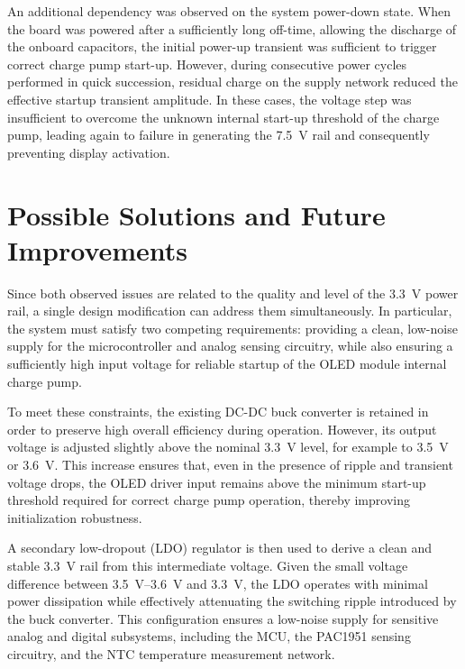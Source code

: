 An additional dependency was observed on the system power-down state. When the board was powered after a sufficiently long off-time, allowing the discharge of the onboard capacitors, the initial power-up transient was sufficient to trigger correct charge pump start-up. However, during consecutive power cycles performed in quick succession, residual charge on the supply network reduced the effective startup transient amplitude. In these cases, the voltage step was insufficient to overcome the unknown internal start-up threshold of the charge pump, leading again to failure in generating the \SI{7.5}{\volt} rail and consequently preventing display activation.

\section{Possible Solutions and Future Improvements}

Since both observed issues are related to the quality and level of the \SI{3.3}{\volt} power rail, a single design modification can address them simultaneously. In particular, the system must satisfy two competing requirements: providing a clean, low-noise supply for the microcontroller and analog sensing circuitry, while also ensuring a sufficiently high input voltage for reliable startup of the OLED module internal charge pump.

To meet these constraints, the existing DC-DC buck converter is retained in order to preserve high overall efficiency during operation. However, its output voltage is adjusted slightly above the nominal \SI{3.3}{\volt} level, for example to \SI{3.5}{\volt} or \SI{3.6}{\volt}. This increase ensures that, even in the presence of ripple and transient voltage drops, the OLED driver input remains above the minimum start-up threshold required for correct charge pump operation, thereby improving initialization robustness.

A secondary low-dropout (LDO) regulator is then used to derive a clean and stable \SI{3.3}{\volt} rail from this intermediate voltage. Given the small voltage difference between \SI{3.5}{\volt}--\SI{3.6}{\volt} and \SI{3.3}{\volt}, the LDO operates with minimal power dissipation while effectively attenuating the switching ripple introduced by the buck converter. This configuration ensures a low-noise supply for sensitive analog and digital subsystems, including the MCU, the PAC1951 sensing circuitry, and the NTC temperature measurement network.

